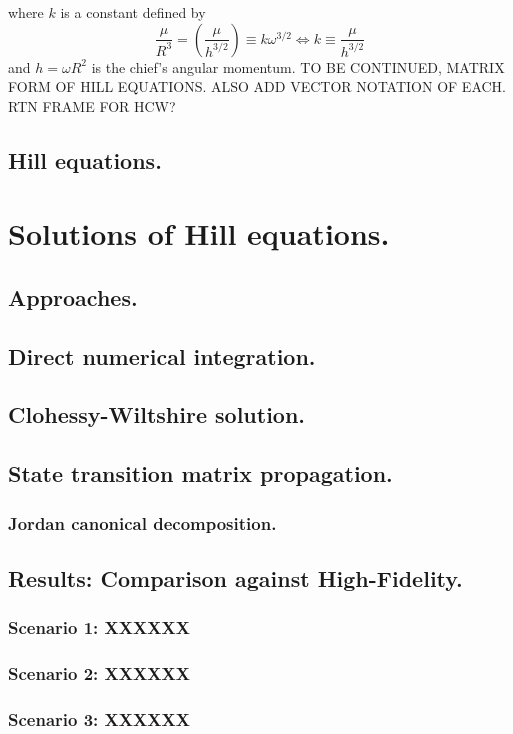 	\noindent where $k$ is a constant defined by 
	\[
	\dfrac{\mu}{R^3} = \left(\dfrac{\mu }{h^{3/2}}\right) \equiv k \omega^{3/2} \Leftrightarrow k \equiv \dfrac{\mu} {h^{3/2}}
	\]
	\indent and $h = \omega R^2$ is the chief's angular momentum. TO BE CONTINUED, MATRIX FORM OF HILL EQUATIONS. ALSO ADD VECTOR NOTATION OF EACH. RTN FRAME FOR HCW?

	\subsection{Hill equations.}
\section{Solutions of Hill equations.}
%
%
	\subsection{Approaches.}
		\subsection{Direct numerical integration.}
		\subsection{Clohessy-Wiltshire solution.}
		\subsection{State transition matrix propagation.}
		\subsubsection{Jordan canonical decomposition.}
	\subsection{Results: Comparison against High-Fidelity.}
		\subsubsection{Scenario 1: XXXXXX}
		\subsubsection{Scenario 2: XXXXXX}
		\subsubsection{Scenario 3: XXXXXX}

